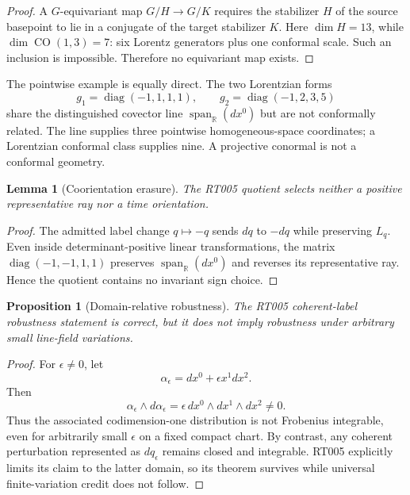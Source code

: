 \documentclass[11pt]{article}
\newtheorem{proposition}{Proposition}
\newtheorem{lemma}{Lemma}
\newcommand{\CO}{\operatorname{CO}}
\newcommand{\Span}{\operatorname{span}_{\mathbb R}}
\begin{document}
\begin{proof}
A $G$-equivariant map $G/H\to G/K$ requires the stabilizer $H$ of the source
basepoint to lie in a conjugate of the target stabilizer $K$.  Here
$\dim H=13$, while $\dim\CO(1,3)=7$: six Lorentz generators plus one conformal
scale.  Such an inclusion is impossible.  Therefore no equivariant map
exists.
\end{proof}

The pointwise example is equally direct.  The two Lorentzian forms
\[
 g_1=\operatorname{diag}(-1,1,1,1),\qquad
 g_2=\operatorname{diag}(-1,2,3,5)
\]
share the distinguished covector line $\Span(dx^0)$ but are not conformally
related.  The line supplies three pointwise homogeneous-space coordinates;
a Lorentzian conformal class supplies nine.  A projective conormal is not a
conformal geometry.

\begin{lemma}[Coorientation erasure]
The RT005 quotient selects neither a positive representative ray nor a time
orientation.
\end{lemma}

\begin{proof}
The admitted label change $q\mapsto-q$ sends $dq$ to $-dq$ while preserving
$L_q$.  Even inside determinant-positive linear transformations, the matrix
$\operatorname{diag}(-1,-1,1,1)$ preserves $\Span(dx^0)$ and reverses its
representative ray.  Hence the quotient contains no invariant sign choice.
\end{proof}

\begin{proposition}[Domain-relative robustness]
The RT005 coherent-label robustness statement is correct, but it does not
imply robustness under arbitrary small line-field variations.
\end{proposition}

\begin{proof}
For $\epsilon\ne0$, let
\[
 \alpha_\epsilon=dx^0+\epsilon x^1dx^2.
\]
Then
\[
 \alpha_\epsilon\wedge d\alpha_\epsilon
 =\epsilon\,dx^0\wedge dx^1\wedge dx^2\ne0.
\]
Thus the associated codimension-one distribution is not Frobenius
integrable, even for arbitrarily small $\epsilon$ on a fixed compact chart.
By contrast, any coherent perturbation represented as $dq_\epsilon$ remains
closed and integrable.  RT005 explicitly limits its claim to the latter
domain, so its theorem survives while universal finite-variation credit does
not follow.
\end{proof}
\end{document}
